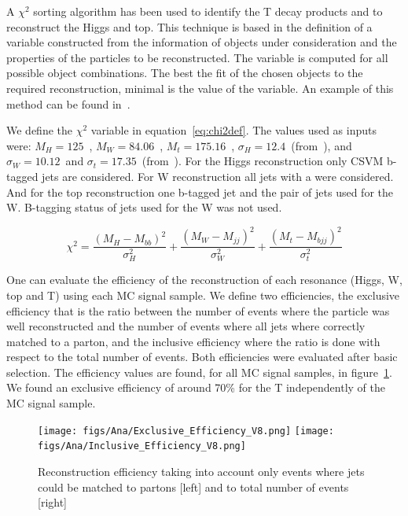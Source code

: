A $\chi^{2}$ sorting algorithm has been used to identify the T decay products and to reconstruct the Higgs and top. This technique is based in the definition of a variable constructed from the information of objects under consideration and the properties of the particles to be reconstructed. The variable is computed for all possible object combinations. The best the fit of the chosen objects to the required reconstruction, minimal is the value of the variable. An example of this method can be found in~\cite{Brochet:1956723}. 

We define the $\chi^{2}$ variable in equation~\ref{eq:chi2def}. The values used as inputs were: $M_{H}=125$~\GeVcc, $M_{W}=84.06$~\GeVcc, $M_{t}=175.16$~\GeVcc, $\sigma_{H}=12.4$~\GeVcc (from~\cite{Chatrchyan:2013zna}), and $\sigma_{W}=10.12$~\GeVcc and $\sigma_{t}=17.35$~\GeVcc (from~\cite{Brochet:1956723}). For the Higgs reconstruction only CSVM b-tagged jets are considered. For W reconstruction all jets with a  were considered. And for the top reconstruction one b-tagged jet and the pair of jets used for the W. B-tagging status of jets used for the W was not used.

\begin{equation}
\chi^{2}=\frac{(M_{H}-M_{bb})^{2}}{\sigma_{H}^{2}}+\frac{(M_{W}-M_{jj})^{2}}{\sigma_{W}^{2}}+\frac{(M_{t}-M_{bjj})^{2}}{\sigma_{t}^{2}}
\label{eq:chi2def}
\end{equation}

One can evaluate the efficiency of the reconstruction of each resonance (Higgs, W, top and T) using each MC signal sample. We define two efficiencies, the exclusive efficiency that is the ratio between the number of events where the particle was well reconstructed and the number of events where all jets where correctly matched to a parton, and the inclusive efficiency where the ratio is done with respect to the total number of events. Both efficiencies were evaluated after basic selection. The efficiency values are found, for all MC signal samples, in figure~\ref{fig:RecEff}. We found an exclusive efficiency of around 70\% for the T independently of the MC signal sample.

\begin{figure}[!Hhtbp]
  \begin{center}
    \texttt{[image: figs/Ana/Exclusive\_Efficiency\_V8.png]}
    \texttt{[image: figs/Ana/Inclusive\_Efficiency\_V8.png]}
    \caption{Reconstruction efficiency taking into account only events where jets could be matched to partons [left] and to total number of events [right]}
    \label{fig:RecEff}
  \end{center}
\end{figure}\clearpage

